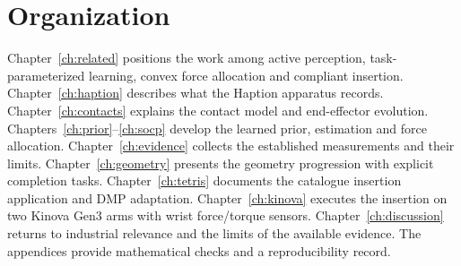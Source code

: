 \section{Organization}

Chapter~\ref{ch:related} positions the work among active perception, task-parameterized learning, convex force allocation and compliant insertion. Chapter~\ref{ch:haption} describes what the Haption apparatus records. Chapter~\ref{ch:contacts} explains the contact model and end-effector evolution. Chapters~\ref{ch:prior}--\ref{ch:socp} develop the learned prior, estimation and force allocation. Chapter~\ref{ch:evidence} collects the established measurements and their limits. Chapter~\ref{ch:geometry} presents the geometry progression with explicit completion tasks. Chapter~\ref{ch:tetris} documents the catalogue insertion application and DMP adaptation. Chapter~\ref{ch:kinova} executes the insertion on two Kinova Gen3 arms with wrist force/torque sensors. Chapter~\ref{ch:discussion} returns to industrial relevance and the limits of the available evidence. The appendices provide mathematical checks and a reproducibility record.

